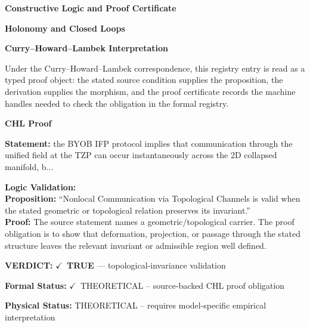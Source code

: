 \clearpage
\begingroup\tzpsupportsetup
\noindent\textbf{\fontsize{10.8pt}{12.8pt}\selectfont [ID 0175] Constructive Logic and Proof Certificate}\par
\noindent\textbf{\fontsize{10pt}{12pt}\selectfont Holonomy and Closed Loops}\par
\vspace{0.45em}
\begingroup
\footnotesize
\setlength{\parskip}{0.22em}
\setlength{\parindent}{0pt}
\noindent\textbf{Curry--Howard--Lambek Interpretation}\par
Under the Curry--Howard--Lambek correspondence, this registry entry is read as a typed proof
object: the stated source condition supplies the proposition, the derivation supplies the
morphism, and the proof certificate records the machine handles needed to check the obligation
in the formal registry.

\vspace{0.45em}
\noindent\textbf{CHL Proof}\par
\textbf{Statement:} the BYOB IFP protocol implies that communication through the unified field at the TZP
can occur instantaneously across the 2D collapsed manifold, b...

\textbf{Logic Validation:}\\
\textbf{Proposition:} ``Nonlocal Communication via Topological Channels is valid when the stated geometric or
topological relation preserves its invariant.''\\
\textbf{Proof:} The source statement names a geometric/topological carrier. The proof obligation is to
show that deformation, projection, or passage through the stated structure leaves the
relevant invariant or admissible region well defined.

\textbf{VERDICT:} \ensuremath{\checkmark}\ \textbf{TRUE} --- topological-invariance validation

\textbf{Formal Status:} \ensuremath{\checkmark}\ THEORETICAL -- source-backed CHL proof obligation

\textbf{Physical Status:} THEORETICAL -- requires model-specific empirical interpretation
\par\vspace{0.45em}
\par
\ifTZPDarkEdition
{}
\fi
\endgroup
\endgroup
